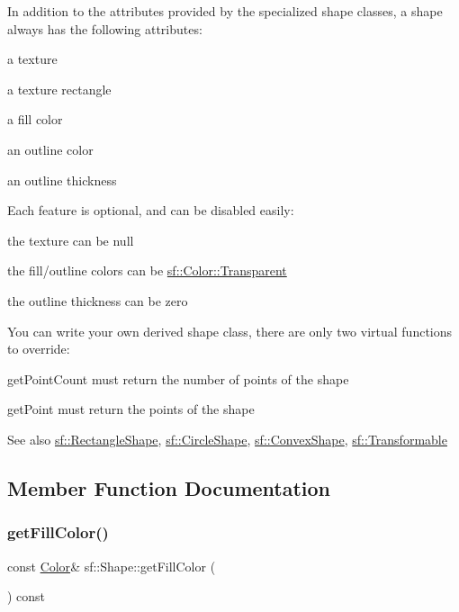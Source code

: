 In addition to the attributes provided by the specialized shape classes, a shape always has the following attributes\+: \begin{DoxyItemize}
\item a texture \item a texture rectangle \item a fill color \item an outline color \item an outline thickness\end{DoxyItemize}
Each feature is optional, and can be disabled easily\+: \begin{DoxyItemize}
\item the texture can be null \item the fill/outline colors can be \hyperlink{classsf_1_1_color_a569b45471737f770656f50ae7bbac292}{sf\+::\+Color\+::\+Transparent} \item the outline thickness can be zero\end{DoxyItemize}
You can write your own derived shape class, there are only two virtual functions to override\+: \begin{DoxyItemize}
\item get\+Point\+Count must return the number of points of the shape \item get\+Point must return the points of the shape\end{DoxyItemize}
\begin{DoxySeeAlso}{See also}
\hyperlink{classsf_1_1_rectangle_shape}{sf\+::\+Rectangle\+Shape}, \hyperlink{classsf_1_1_circle_shape}{sf\+::\+Circle\+Shape}, \hyperlink{classsf_1_1_convex_shape}{sf\+::\+Convex\+Shape}, \hyperlink{classsf_1_1_transformable}{sf\+::\+Transformable} 
\end{DoxySeeAlso}


\subsection{Member Function Documentation}
\mbox{\label{classsf_1_1_shape_ae3030128824e687f259d18addcf33528}} 
\subsubsection{\texorpdfstring{get\+Fill\+Color()}{getFillColor()}}
{\footnotesize\ttfamily const \hyperlink{classsf_1_1_color}{Color}\& sf\+::\+Shape\+::get\+Fill\+Color (\begin{DoxyParamCaption}{ }\end{DoxyParamCaption}) const}



